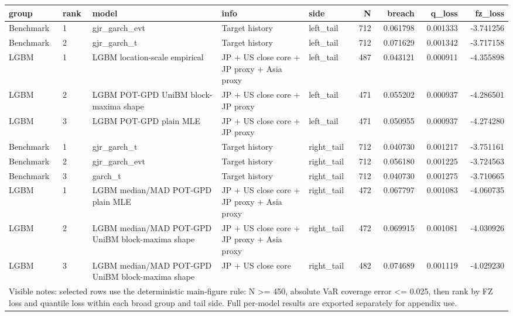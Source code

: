 \begin{tabular}{ll ll lrrrr}
\toprule
group & rank & model & info & side & N & breach & q_loss & fz_loss \\
\midrule
Benchmark & 1 & gjr\_garch\_evt & Target history & left\_tail & 712 & 0.061798 & 0.001333 & -3.741256 \\
Benchmark & 2 & gjr\_garch\_t & Target history & left\_tail & 712 & 0.071629 & 0.001342 & -3.717158 \\
LGBM & 1 & LGBM location-scale empirical & JP + US close core + JP proxy + Asia proxy & left\_tail & 487 & 0.043121 & 0.000911 & -4.355898 \\
LGBM & 2 & LGBM POT-GPD UniBM block-maxima shape & JP + US close core + JP proxy & left\_tail & 471 & 0.055202 & 0.000937 & -4.286501 \\
LGBM & 3 & LGBM POT-GPD plain MLE & JP + US close core + JP proxy & left\_tail & 471 & 0.050955 & 0.000937 & -4.274280 \\
Benchmark & 1 & gjr\_garch\_t & Target history & right\_tail & 712 & 0.040730 & 0.001217 & -3.751161 \\
Benchmark & 2 & gjr\_garch\_evt & Target history & right\_tail & 712 & 0.056180 & 0.001225 & -3.724563 \\
Benchmark & 3 & garch\_t & Target history & right\_tail & 712 & 0.040730 & 0.001275 & -3.710665 \\
LGBM & 1 & LGBM median/MAD POT-GPD plain MLE & JP + US close core + JP proxy + Asia proxy & right\_tail & 472 & 0.067797 & 0.001083 & -4.060735 \\
LGBM & 2 & LGBM median/MAD POT-GPD UniBM block-maxima shape & JP + US close core + JP proxy + Asia proxy & right\_tail & 472 & 0.069915 & 0.001081 & -4.030926 \\
LGBM & 3 & LGBM median/MAD POT-GPD UniBM block-maxima shape & JP + US close core & right\_tail & 482 & 0.074689 & 0.001119 & -4.029230 \\
\midrule
\multicolumn{9}{l}{\footnotesize Visible notes: selected rows use the deterministic main-figure rule: N >= 450, absolute VaR coverage error <= 0.025, then rank by FZ loss and quantile loss within each broad group and tail side. Full per-model results are exported separately for appendix use.} \\
\bottomrule
\end{tabular}
